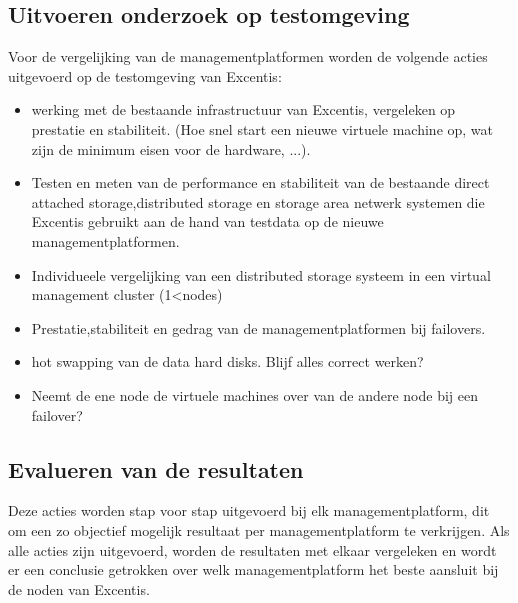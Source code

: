 \subsection{Uitvoeren onderzoek op testomgeving}
Voor de vergelijking van de managementplatformen worden de volgende acties uitgevoerd op de testomgeving van Excentis:
\begin{itemize}
\item werking met de bestaande infrastructuur van Excentis, vergeleken op prestatie en stabiliteit. (Hoe snel start een nieuwe virtuele machine op, wat zijn de minimum eisen voor de hardware, ...).
\item Testen en meten van de performance en stabiliteit van de bestaande direct attached storage,distributed storage en storage area netwerk systemen die Excentis gebruikt aan de hand van testdata op de nieuwe managementplatformen.
\item Individueele vergelijking van een distributed storage systeem in een virtual management cluster (1<nodes)
\item Prestatie,stabiliteit en gedrag van de managementplatformen bij failovers.
\item hot swapping van de data hard disks. Blijf alles correct werken? 
\item Neemt de ene node de virtuele machines over van de andere node bij een failover?
\end{itemize}

\subsection{Evalueren van de resultaten}
Deze acties worden stap voor stap uitgevoerd bij elk managementplatform, dit om een zo objectief mogelijk resultaat per managementplatform te verkrijgen.
Als alle acties zijn uitgevoerd, worden de resultaten met elkaar vergeleken en wordt er een conclusie getrokken over welk managementplatform het beste aansluit bij de noden van Excentis.